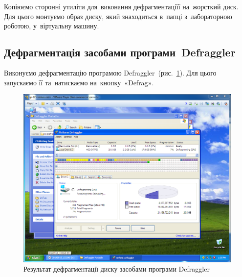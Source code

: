 \documentclass[
	a4paper,
	oneside,
	DIV = 12,
	fontsize = 13pt,
	headings = normal,
]{scrartcl}
\begin{document}
		Копіюємо сторонні утиліти для~виконання дефрагментаціїї на~жорсткий диск. Для цього монтуємо образ диску, який знаходиться в~папці з~лабораторною роботою, у~віртуальну машину.

		\subsection{Дефрагментація засобами програми~\textenglish{Defraggler}}
			Виконуємо дефрагментацію програмою \textenglish{Defraggler}~(рис.~\ref{fig:02-defraggler-defrag}). Для цього запускаємо її та~натискаємо на~кнопку~\textenglish{«Defrag»}.
			\begin{figure}[!htbp]
				\centering
				\includegraphics[height = 8\baselineskip]{./assets/lab-02-03.png}
				\caption{Результат дефрагментації диску засобами програми \textenglish{Defraggler}}
				\label{fig:02-defraggler-defrag}
			\end{figure}
\end{document}
